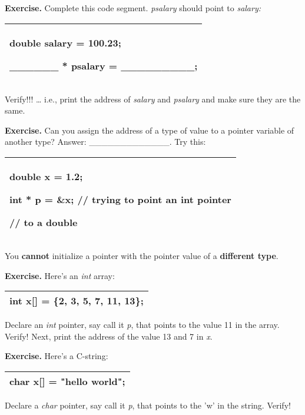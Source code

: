 \documentclass[
]{article}
\begin{document}
\textbf{Exercise.} Complete this code segment. \emph{psalary} should
point to \emph{salary:}

\begin{longtable}[]{@{}l@{}}
\toprule
\endhead
\begin{minipage}[t]{0.97\columnwidth}\raggedright
double salary = 100.23;

\_\_\_\_\_\_ * psalary = \_\_\_\_\_\_\_\_\_;\strut
\end{minipage}\tabularnewline
\bottomrule
\end{longtable}

Verify!!! \ldots{} i.e., print the address of \emph{salary} and
\emph{psalary} and make sure they are the same.

\textbf{Exercise.} Can you assign the address of a type of value to a
pointer variable of another type? Answer: \_\_\_\_\_\_\_\_\_\_\_\_\_.
Try this:

\begin{longtable}[]{@{}l@{}}
\toprule
\endhead
\begin{minipage}[t]{0.97\columnwidth}\raggedright
double x = 1.2;

int * p = \&x; // trying to point an int pointer

// to a double\strut
\end{minipage}\tabularnewline
\bottomrule
\end{longtable}

You \textbf{cannot} initialize a pointer with the pointer value of a
\textbf{different type}.

\textbf{Exercise.} Here's an \emph{int} array:

\begin{longtable}[]{@{}l@{}}
\toprule
\endhead
int x{[}{]} = \{2, 3, 5, 7, 11, 13\};\tabularnewline
\bottomrule
\end{longtable}

Declare an \emph{int} pointer, say call it \emph{p}, that points to the
value 11 in the array. Verify! Next, print the address of the value 13
and 7 in \emph{x}.

\textbf{Exercise.} Here's a C-string:

\begin{longtable}[]{@{}l@{}}
\toprule
\endhead
char x{[}{]} = "hello world";\tabularnewline
\bottomrule
\end{longtable}

Declare a \emph{char} pointer, say call it \emph{p}, that points to the
'w' in the string. Verify!
\end{document}
